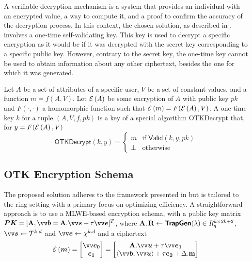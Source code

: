 A verifiable decryption mechanism is a system that provides an individual with an encrypted value, a way to compute it, and a proof to confirm the accuracy of the decryption process. In this context, the chosen solution, as described in \cite{chillottiHomomorphicLWEBased2016}, involves a one-time self-validating key. This key is used to decrypt a specific encryption as it would be if it was decrypted with the secret key corresponding to a specific public key. However, contrary to the secret key, the one-time key cannot be used to obtain information about any other ciphertext, besides the one for which it was generated.

\begin{definition}
Let $A$ be a set of attributes of a specific user, $V$ be a set of constant values, and a function $m=f(A,V)$. Let $\mathcal{E}\left({A}\right)$ be some encryption of $A$ with public key $pk$ and $F(\cdot,\cdot)$ a homomorphic function such that $\mathcal{E}\left({m}\right)=F(\mathcal{E}\left({A}\right),V)$. A one-time key $k$ for a tuple $(A,V,f,pk)$ is a key of a special algorithm \textsf{OTKDecrypt} that, for $y=F(\mathcal{E}\left({A}\right),V)$
\[\textsf{OTKDecrypt}(k,y)= \begin{cases} m & \mbox{if }  \textsf{Valid}(k,y,pk) \\ \perp & \mbox{otherwise} \end{cases}\]
\end{definition} 

\subsection{OTK Encryption Schema} \label{sec:otkschema} 

The proposed solution adheres to the framework presented in \cite{chillottiHomomorphicLWEBased2016} but is tailored to the ring setting with a primary focus on optimizing efficiency. A straightforward approach is to use a \ac{MLWE}-based encryption schema, with a public key matrix $\p{PK}=[\pA,\pv{b}=\pA.\pv{s}+\tau\pv{e}]^T$,  where $\mathbf{A},\mathbf{R} \leftarrow \textsf{\textbf{TrapGen}}(\lambda) \in \mathit{R}^{k\times 2k+2}_q$, $\pv{s} \from \T^{k.d}$ and $\pv{e} \from \chi^{k.d}$ and a ciphertext
\begin{equation}\label{eq:mcipher}
\enc{\p{m}}=\begin{bmatrix}\pv{c_0}\\\p{c_1}\end{bmatrix}=\begin{bmatrix}\pA.\pv{u}+\tau\pv{e_1}\\\inprod{\pv{b}}{\pv{u}}+\tau\p{e_2}+\Delta.\ppm\end{bmatrix}
\end{equation}


